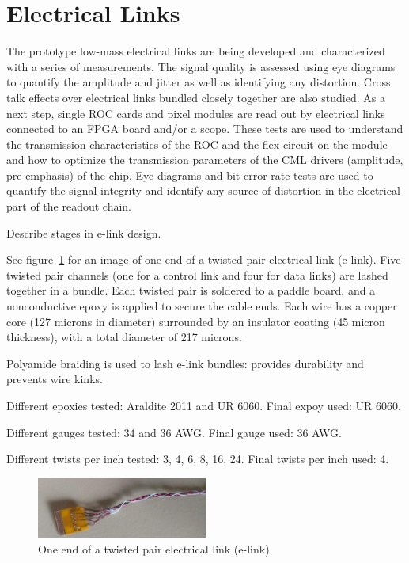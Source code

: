 \documentclass[a4paper,11pt]{article}
\begin{document}
\section{Electrical Links}
\label{sec:electrical}

The prototype low-mass electrical links are being developed and characterized with a series of measurements.
The signal quality is assessed using eye diagrams to quantify the amplitude and jitter as well as identifying any distortion.
Cross talk effects over electrical links bundled closely together are also studied.
As a next step, single ROC cards and pixel modules are read out by electrical links connected to an FPGA board and/or a scope.
These tests are used to understand the transmission characteristics of the ROC and the flex circuit on the module and how to optimize the transmission parameters of the CML drivers (amplitude, pre-emphasis) of the chip.
Eye diagrams and bit error rate tests are used to quantify the signal integrity and identify any source of distortion in the electrical part of the readout chain.


Describe stages in e-link design.

See figure~\ref{fig:elink} for an image of one end of a twisted pair electrical link (e-link).
Five twisted pair channels (one for a control link and four for data links) are lashed together in a bundle.
Each twisted pair is soldered to a paddle board, and a nonconductive epoxy is applied to secure the cable ends.
Each wire has a copper core (127 microns in diameter) surrounded by an insulator coating (45 micron thickness), with a total diameter of 217 microns.

Polyamide braiding is used to lash e-link bundles: provides durability and prevents wire kinks.

Different epoxies tested: Araldite 2011 and UR 6060.
Final expoy used: UR 6060.

Different gauges tested: 34 and 36 AWG.
Final gauge used: 36 AWG.

Different twists per inch tested: 3, 4, 6, 8, 16, 24.
Final twists per inch used: 4.

\begin{figure}[htbp]
\centering
\includegraphics[width=0.5\textwidth,origin=c]{../figures/e-link-1.jpg}
\caption{
\label{fig:elink}
One end of a twisted pair electrical link (e-link).
}
\end{figure}
\end{document}
